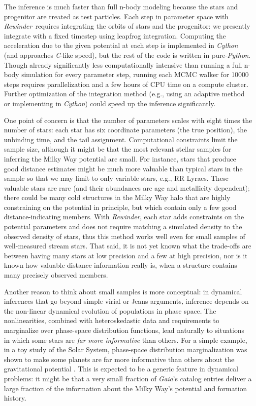 \documentclass[letterpaper,12pt,preprint]{aastex}
\newcommand{\project}[1]{\textsl{#1}}
\newcommand{\gaia}{\project{Gaia}}
\newcommand{\rewinder}{\emph{Rewinder}}
\begin{document}
The inference is much faster than full n-body modeling because the stars and progenitor are treated as test particles. Each step in parameter space with \rewinder\, requires integrating the orbits of stars and the progenitor: we presently integrate with a fixed timestep using leapfrog integration. Computing the acceleration due to the given potential at each step is implemented in \project{Cython} (and approaches \project{C}-like speed), but the rest of the code is written in pure-\project{Python}. Though already significantly less computationally intensive than running a full n-body simulation for every parameter step, running each MCMC walker for 10000 steps requires parallelization and a few hours of CPU time on a compute cluster. Further optimization of the integration method (e.g., using an adaptive method or implementing in \project{Cython}) could speed up the inference significantly. 

One point of concern is that the number of parameters scales with eight times the number of stars: each star has six coordinate parameters (the true position), the unbinding time, and the tail assignment. Computational constraints limit the sample size, although it might be that the most relevant stellar samples for inferring the Milky Way potential are small. For instance, stars that produce good distance estimates might be much more valuable than typical stars in the sample so that we may limit to only variable stars, e.g., RR Lyraes. These valuable stars are rare (and their abundances are age and metallicity dependent); there could be many cold structures in the Milky Way halo that are highly constraining on the potential in principle, but which contain only a few good distance-indicating members. With \rewinder, each star adds constraints on the potential parameters and does not require matching a simulated density to the observed density of stars, thus this method works well even for small samples of well-measured stream stars. That said, it is not yet known what the trade-offs are between having many stars at low precision and a few at high precision, nor is it known how valuable distance information really is, when a structure contains many precisely observed members. 

Another reason to think about small samples is more conceptual:
in dynamical inferences that go beyond simple virial or Jeans arguments,
  inference depends on the non-linear dynamical evolution of populations in phase space.
The nonlinearities, 
  combined with heteroskedastic data and requirements to marginalize over phase-space distribution functions,
  lead naturally to situations in which some stars are \emph{far more informative} than others.
For a simple example, in a toy study of the Solar System,
  phase-space distribution marginalization was shown to make some planets are far more informative than others
  about the gravitational potential \citep{bovy10}.
This is expected to be a generic feature in dynamical problems:
  it might be that a very small fraction of \gaia's catalog entries
  deliver a large fraction of the information about the Milky Way's potential and formation history.
\end{document}
